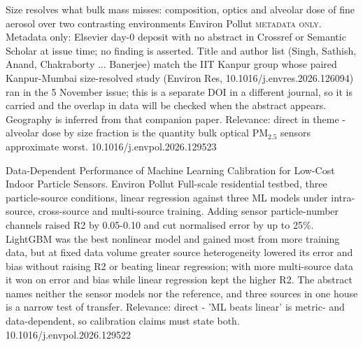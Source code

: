 \documentclass[10pt]{article}
\begin{document}
{Size resolves what bulk mass misses: composition, optics and alveolar dose of fine aerosol over two contrasting environments}
{Environ Pollut}
{\textsc{metadata only.} Metadata only: Elsevier day-0 deposit with no abstract in Crossref or Semantic Scholar at issue time; no finding is asserted. Title and author list (Singh, Sathish, Anand, Chakraborty ... Banerjee) match the IIT Kanpur group whose paired Kanpur-Mumbai size-resolved study (Environ Res, 10.1016/j.envres.2026.126094) ran in the 5 November issue; this is a separate DOI in a different journal, so it is carried and the overlap in data will be checked when the abstract appears. Geography is inferred from that companion paper. Relevance: direct in theme - alveolar dose by size fraction is the quantity bulk optical PM$_{2.5}$ sensors approximate worst.}
{10.1016/j.envpol.2026.129523}

\par{}\baselineskip{}\baselineskip
{}

{Data-Dependent Performance of Machine Learning Calibration for Low-Cost Indoor Particle Sensors.}
{Environ Pollut}
{Full-scale residential testbed, three particle-source conditions, linear regression against three ML models under intra-source, cross-source and multi-source training. Adding sensor particle-number channels raised R2 by 0.05-0.10 and cut normalised error by up to 25\%. LightGBM was the best nonlinear model and gained most from more training data, but at fixed data volume greater source heterogeneity lowered its error and bias without raising R2 or beating linear regression; with more multi-source data it won on error and bias while linear regression kept the higher R2. The abstract names neither the sensor models nor the reference, and three sources in one house is a narrow test of transfer. Relevance: direct - 'ML beats linear' is metric- and data-dependent, so calibration claims must state both.}
{10.1016/j.envpol.2026.129522}
\end{document}
